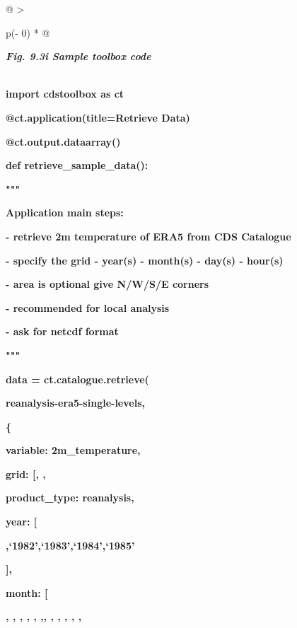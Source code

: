 \documentclass[
  letterpaper,
  DIV=11,
  numbers=noendperiod]{scrreprt}
\begin{document}
\begin{longtable}[]{@{}
  >{\raggedright\arraybackslash}p{(\columnwidth - 0\tabcolsep) * }@{}}
\toprule\noalign{}
\begin{minipage}[b]{\linewidth}\raggedright
\textbf{\emph{Fig. 9.3i Sample toolbox code}}
\end{minipage} \\
\midrule\noalign{}
\endhead
\bottomrule\noalign{}
\endlastfoot
\textbf{import cdstoolbox as ct}

\textbf{@ct.application(title=\textquotesingle Retrieve
Data\textquotesingle)}

\textbf{@ct.output.dataarray()}

\textbf{def retrieve\_sample\_data():}

\textbf{"""}

\textbf{Application main steps:}

\textbf{- retrieve 2m temperature of ERA5 from CDS Catalogue}

\textbf{- specify the grid - year(s) - month(s) - day(s) - hour(s)}

\textbf{- area is optional give N/W/S/E corners}

\textbf{- recommended for local analysis}

\textbf{- ask for netcdf format}

\textbf{"""}

\textbf{data = ct.catalogue.retrieve(}

\textbf{\textquotesingle reanalysis-era5-single-levels\textquotesingle,}

\textbf{\{}

\textbf{\textquotesingle variable\textquotesingle:
\textquotesingle2m\_temperature\textquotesingle,}

\textbf{\textquotesingle grid\textquotesingle:
{[}\textquotesingle,
\textquotesingle{]},}

\textbf{\textquotesingle product\_type\textquotesingle:
\textquotesingle reanalysis\textquotesingle,}

\textbf{\textquotesingle year\textquotesingle: {[}}

\textbf{\textquotesingle,`1982',`1983',`1984',`1985'}

\textbf{{]},}

\textbf{\textquotesingle month\textquotesingle: {[}}

\textbf{\textquotesingle,
\textquotesingle, \textquotesingle,
\textquotesingle, \textquotesingle,
\textquotesingle,\textquotesingle,
\textquotesingle, \textquotesingle,
\textquotesingle, \textquotesingle,
\textquotesingle,}


\end{longtable}
\end{document}
